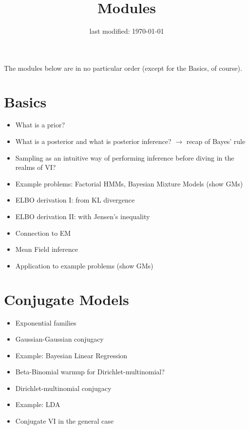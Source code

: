 \documentclass[11pt, a4paper]{article}
\title{Modules}
\date{last modified: \today}
\author{}
\newcommand{\wnote}[1]{\textcolor{red}{#1}}
\begin{document}
\maketitle


The modules below are in no particular order (except for the Basics, of course).

 
\section{Basics}

\begin{itemize}
\item What is a prior?
\item What is a posterior and what is posterior inference? $ \rightarrow $ recap of Bayes' rule
\item Sampling as an intuitive way of performing inference before diving in the realms of VI?
\item Example problems: Factorial HMMs, Bayesian Mixture Models (show GMs)
\item ELBO derivation I: from KL divergence
\item ELBO derivation II: with Jensen's inequality
\item Connection to EM
\item Mean Field inference
\item Application to example problems (show GMs)
\end{itemize}

\section{Conjugate Models}

\begin{itemize}
\item Exponential families
\item Gaussian-Gaussian conjugacy
\item Example: Bayesian Linear Regression
\item Beta-Binomial warmup for Dirichlet-multinomial?
\item Dirichlet-multinomial conjugacy
\item Example: LDA
\item Conjugate VI in the general case \citep{Beal:2003}
\end{itemize}
\end{document}
